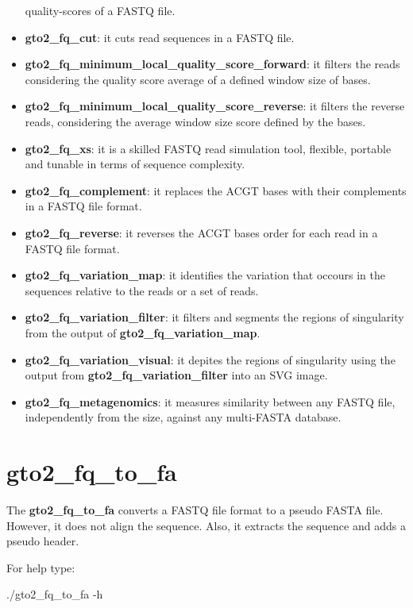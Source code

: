 \documentclass[11pt,]{krantz}
\newenvironment{Shaded}{\begin{snugshade}}{\end{snugshade}}
\newcommand{\ExtensionTok}[1]{#1}
\newcommand{\NormalTok}[1]{#1}
\begin{document}
\begin{itemize}
  quality-scores of a FASTQ file.
\item
  \textbf{gto2\_fq\_cut}: it cuts read sequences in a FASTQ file.
\item
  \textbf{gto2\_fq\_minimum\_local\_quality\_score\_forward}: it filters
  the reads considering the quality score average of a defined window
  size of bases.
\item
  \textbf{gto2\_fq\_minimum\_local\_quality\_score\_reverse}: it filters
  the reverse reads, considering the average window size score defined
  by the bases.
\item
  \textbf{gto2\_fq\_xs}: it is a skilled FASTQ read simulation tool,
  flexible, portable and tunable in terms of sequence complexity.
\item
  \textbf{gto2\_fq\_complement}: it replaces the ACGT bases with their
  complements in a FASTQ file format.
\item
  \textbf{gto2\_fq\_reverse}: it reverses the ACGT bases order for each
  read in a FASTQ file format.
\item
  \textbf{gto2\_fq\_variation\_map}: it identifies the variation that
  occours in the sequences relative to the reads or a set of reads.
\item
  \textbf{gto2\_fq\_variation\_filter}: it filters and segments the
  regions of singularity from the output of
  \textbf{gto2\_fq\_variation\_map}.
\item
  \textbf{gto2\_fq\_variation\_visual}: it depites the regions of
  singularity using the output from \textbf{gto2\_fq\_variation\_filter}
  into an SVG image.
\item
  \textbf{gto2\_fq\_metagenomics}: it measures similarity between any
  FASTQ file, independently from the size, against any multi-FASTA
  database.
\end{itemize}

\section{gto2\_fq\_to\_fa}\label{gto2_fq_to_fa}

The \textbf{gto2\_fq\_to\_fa} converts a FASTQ file format to a pseudo
FASTA file. However, it does not align the sequence. Also, it extracts
the sequence and adds a pseudo header.

For help type:

\begin{Shaded}
\begin{Highlighting}[]
\ExtensionTok{./gto2_fq_to_fa}\NormalTok{ -h}
\end{Highlighting}
\end{Shaded}
\end{document}
